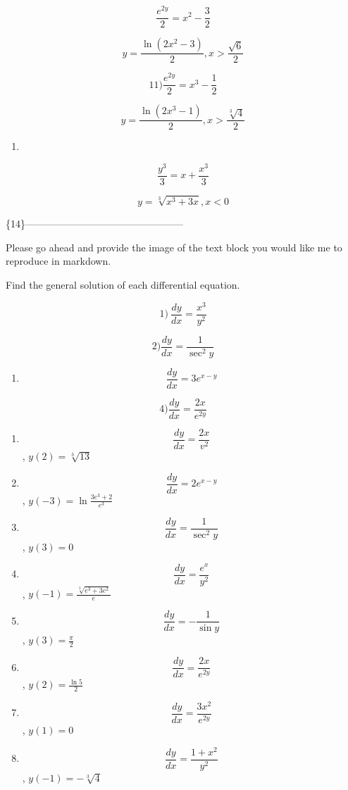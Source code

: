 \documentclass[
]{article}
\providecommand{\tightlist}{%
  \setlength{\itemsep}{0pt}\setlength{\parskip}{0pt}}
\begin{document}
\[\frac{e^{2y}}{2} = x^2 - \frac{3}{2}\]

\[y = \frac{\ln(2x^2 - 3)}{2}, x > \frac{\sqrt{6}}{2}\]

\[11) \frac{e^{2y}}{2} = x^3 - \frac{1}{2}\]

\[y = \frac{\ln(2x^3 - 1)}{2}, x > \frac{\sqrt[3]{4}}{2}\]

\begin{enumerate}
\def\labelenumi{\arabic{enumi})}
\setcounter{enumi}{11}
\tightlist
\item
\end{enumerate}

\[\frac{y^3}{3} = x + \frac{x^3}{3}\]

\[y = \sqrt[3]{x^3 + 3x}, x < 0\]

\{14\}------------------------------------------------

Please go ahead and provide the image of the text block you would like
me to reproduce in markdown.

Find the general solution of each differential equation.

\[1) \ \frac{dy}{dx} = \frac{x^3}{y^2}\]

\[2) \frac{dy}{dx} = \frac{1}{\sec^2 y}\]

\begin{enumerate}
\def\labelenumi{\arabic{enumi})}
\setcounter{enumi}{2}
\tightlist
\item
  \[\frac{dy}{dx} = 3e^{x-y}\]
\end{enumerate}

\[4) \frac{dy}{dx} = \frac{2x}{e^{2y}}\]

\begin{enumerate}
\def\labelenumi{\arabic{enumi})}
\setcounter{enumi}{4}
\item
  \[\frac{dy}{dx} = \frac{2x}{v^2}\] , \(y(2) = \sqrt[3]{13}\)
\item
  \[\frac{dy}{dx} = 2e^{x-y}\] , \(y(-3) = \ln \frac{3e^3 + 2}{e^3}\)
\item
  \[\frac{dy}{dx} = \frac{1}{\sec^2 y}\] , \(y(3) = 0\)
\item
  \[\frac{dy}{dx} = \frac{e^x}{y^2}\] ,
  \(y(-1) = \frac{\sqrt[3]{e^3 + 3e^2}}{e}\)
\item
  \[\frac{dy}{dx} = -\frac{1}{\sin y}\] , \(y(3) = \frac{\pi}{2}\)
\item
  \[\frac{dy}{dx} = \frac{2x}{e^{2y}}\] , \(y(2) = \frac{\ln 5}{2}\)
\item
  \[\frac{dy}{dx} = \frac{3x^2}{e^{2y}}\] , \(y(1) = 0\)
\item
  \[\frac{dy}{dx} = \frac{1+x^2}{y^2}\] , \(y(-1) = -\sqrt[3]{4}\)
\end{enumerate}
\end{document}
